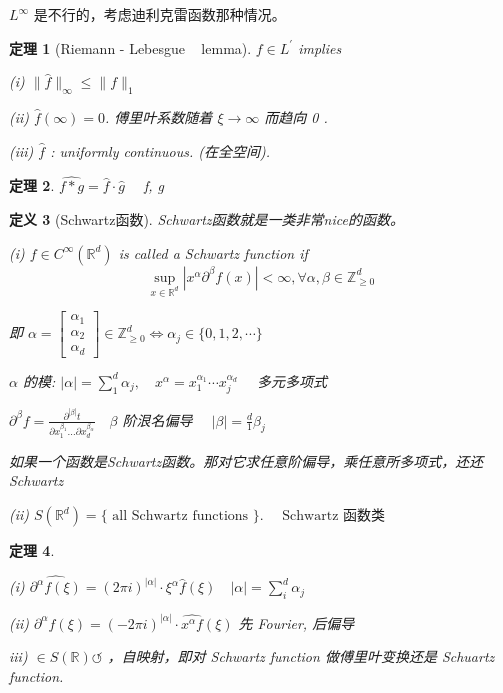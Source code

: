 \documentclass[10pt,openany]{book}
\theoremstyle{thmstyle} %
\newtheorem{theorem}{定理}[chapter]
\theoremstyle{defstyle} %
\newtheorem{definition}[theorem]{定义}
\theoremstyle{prostyle} %
\begin{document}
$L^\infty$ 是不行的，考虑迪利克雷函数那种情况。

\begin{theorem}[Riemann - Lebesgue ~ lemma]
$f \in L^{\prime}$ implies

(i) $\|\hat{f}\|_{\infty} \leqslant\|f\|_1$

(ii) $\hat{f}(\infty)=0$. 傅里叶系数随着 $\xi \rightarrow \infty$ 而趋向 0 .

(iii) $\hat{f}$ : uniformly continuous. (在全空间).
\end{theorem}


\begin{theorem}
$\widehat{f * g}=\hat{f} \cdot \hat{g} \quad$ f, g 
\end{theorem}

\begin{definition}[Schwartz函数]
Schwartz函数就是一类非常nice的函数。

(i) $f \in C^{\infty}\left(\mathbb{R}^d\right)$ is called a Schwartz function if
$$
\sup_{x \in \mathbb{R}^d} \left|x^\alpha \partial^\beta f(x)\right|<\infty, \forall \alpha, \beta \in \mathbb{Z}^d_{\geq 0} 
$$  

即 $\alpha=\left[\begin{array}{l}\alpha_1 \\ \alpha_2 \\ \alpha_d\end{array}\right] \in \mathbb{Z}_{\geq 0}^d \Leftrightarrow \alpha_j \in\{0,1,2, \cdots\}$

$\alpha$ 的模: $|\alpha|=\sum_1^d \alpha_j, \quad x^\alpha=x_1^{\alpha_1} \cdots x_j^{\alpha_d} \quad$ 多元多项式

$\partial^\beta f=\frac{\partial^{|\beta|} t}{\partial x_1^{\beta_1} \ldots \partial x_d^{\beta_\alpha}} \quad \beta$ 阶泿名偏导 $\quad|\beta|=\frac{d}{1} \beta_j$

如果一个函数是Schwartz函数。那对它求任意阶偏导，乘任意所多项式，还还Schwartz

(ii) $S\left(\mathbb{R}^d\right)=\{\text { all Schwartz functions }\} . \quad \text { Schwartz 函数类 }$
\end{definition}



\begin{theorem} \

(i) $\widehat{\partial^\alpha f(\xi)} = (2 \pi i)^{|\alpha|} \cdot \xi^{\alpha} \hat{f}(\xi) \quad|\alpha|=\sum_i^d \alpha_j$

(ii) $\partial^\alpha \hat{f}(\xi)=(-2 \pi i)^{|\alpha|} \cdot \widehat{x^\alpha f}(\xi)$ 先 Fourier, 后偏导

iii) $ \in S(\mathbb{R}) \circlearrowleft$ ，自映射，即对 Schwartz function 做傅里叶变换还是 Schuartz function.
\end{theorem}
\end{document}

